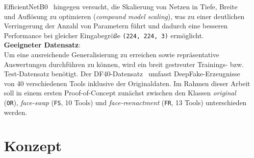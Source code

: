 \documentclass{article}
\newcommand{\imgsize}{\texttt{(224, 224, 3)}\xspace}
\newcommand{\effnet}{EfficientNetB0\xspace}
\begin{document}
\effnet~\cite{efficientnet} hingegen versucht, die Skalierung von Netzen in Tiefe, Breite und Auflösung zu optimieren (\textit{compound model scaling}), was zu einer deutlichen Verringerung der Anzahl von Parametern führt und dadurch eine besseren Performance bei gleicher Eingabegröße \imgsize ermöglicht.
\\[0.5em]
\textbf{Geeigneter Datensatz}:\\
Um eine ausreichende Generalisierung zu erreichen sowie repräsentative Auswertungen durchführen zu können, wird ein breit gestreuter Trainings- bzw. Test-Datensatz benötigt.
Der DF40-Datensatz~\cite{yan2024df40} umfasst DeepFake-Erzeugnisse von 40 verschiedenen Tools inklusive der Originaldaten.
Im Rahmen dieser Arbeit soll in einem ersten Proof-of-Concept zunächst zwischen den Klassen \textit{original} (\texttt{OR}), \textit{face-swap} (\texttt{FS}, 10 Tools) und \textit{face-reenactment} (\texttt{FR}, 13 Tools) unterschieden werden.

\section{Konzept}\label{sec:concept}
\end{document}
